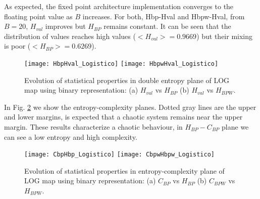 As expected, the fixed point architecture implementation converges to the floating point value as $B$ increases.
For both, Hbp-Hval and Hbpw-Hval, from $B=20$, $H_{val}$ improves but $H_{BP}$ remains constant.
It can be seen that the distribution of values reaches high values ($<H_{val}>=0.9669$) but their mixing is poor ($<H_{BP}>=0.6269$).

\begin{figure}
	\texttt{[image: HbpHval\_Logistico]}
	\texttt{[image: HbpwHval\_Logistico]}
	\caption{Evolution of statistical properties in double entropy plane of LOG map using binary representation: (a) $H_{val}$ vs $H_{BP}$ (b) $H_{val}$ vs $H_{BPW}$.}
	\label{fig:LOG_HH}
\end{figure}

In Fig. \ref{fig:LOG_HC} we show the entropy-complexity planes.
Dotted gray lines are the upper and lower margins, is expected that a chaotic system remains near the upper margin.
These results characterize a chaotic behaviour, in $H_{BP}-C_{BP}$ plane we can see a low entropy and high complexity.

\begin{figure}
	\texttt{[image: CbpHbp\_Logistico]}
	\texttt{[image: CbpwHbpw\_Logistico]}
	\caption{Evolution of statistical properties in entropy-complexity plane of LOG map using binary representation: (a) $C_{BP}$ vs $H_{BP}$ (b) $C_{BPW}$ vs $H_{BPW}$.}
	\label{fig:LOG_HC}
\end{figure}
